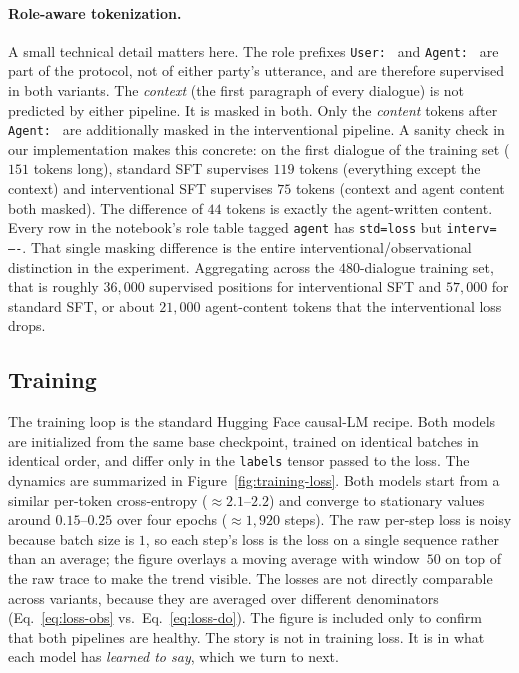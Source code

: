 \documentclass[11pt]{article}
\begin{document}
\paragraph{Role-aware tokenization.}
A small technical detail matters here. The role prefixes \texttt{User:~}
and \texttt{Agent:~} are part of the protocol, not of either party's
utterance, and are therefore supervised in both variants. The
\emph{context} (the first paragraph of every dialogue) is not predicted by
either pipeline. It is masked in both. Only the \emph{content} tokens
after \texttt{Agent:~} are additionally masked in the interventional
pipeline. A sanity check in our implementation makes this concrete: on
the first dialogue of the training set ($151$ tokens long), standard SFT
supervises $119$ tokens (everything except the context) and interventional
SFT supervises $75$ tokens (context and agent content both masked). The
difference of $44$ tokens is exactly the agent-written content. Every
row in the notebook's role table tagged \texttt{agent} has
\texttt{std=loss} but \texttt{interv=----}. That single masking difference
is the entire interventional/observational distinction in the experiment.
Aggregating across the $480$-dialogue training set, that is roughly
$36{,}000$ supervised positions for interventional SFT and $57{,}000$ for
standard SFT, or about $21{,}000$ agent-content tokens that the
interventional loss drops.


\subsection{Training}
\label{sec:experiment-training}

The training loop is the standard Hugging Face causal-LM recipe. Both models
are initialized from the same base checkpoint, trained on identical batches
in identical order, and differ only in the \texttt{labels} tensor passed to
the loss. The dynamics are summarized in
Figure~\ref{fig:training-loss}. Both models start from a similar
per-token cross-entropy ($\approx 2.1$--$2.2$) and converge to stationary
values around $0.15$--$0.25$ over four epochs ($\approx 1{,}920$ steps).
The raw per-step loss is noisy because batch size is $1$, so each step's
loss is the loss on a single sequence rather than an average; the figure
overlays a moving average with window~$50$ on top of the raw trace to
make the trend visible. The losses are not directly comparable across
variants, because they are averaged over different denominators
(Eq.~\ref{eq:loss-obs} vs.\ Eq.~\ref{eq:loss-do}). The figure is included
only to confirm that both pipelines are healthy. The story is not in
training loss. It is in what each model has \emph{learned to say}, which
we turn to next.
\end{document}
